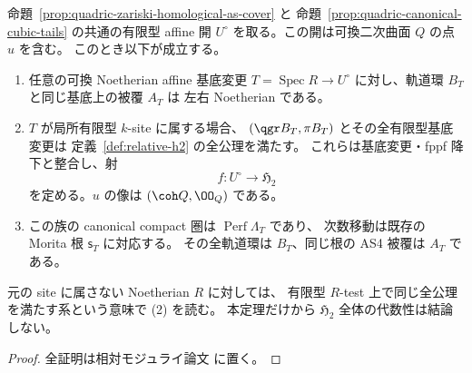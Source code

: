 \begin{theorem}[可換二次曲面の有限型相対実現]
\label{thm:quadric-finite-type-effectivity}
命題~\ref{prop:quadric-zariski-homological-as-cover} と
命題~\ref{prop:quadric-canonical-cubic-tails} の共通の有限型 affine 開
$U^\circ$ を取る。この開は可換二次曲面 $Q$ の点 $u$ を含む。
このとき以下が成立する。
\begin{enumerate}
\item 任意の可換 Noetherian affine 基底変更
$T=\operatorname{Spec}R\to U^\circ$ に対し、軌道環 $B_T$ と同じ基底上の被覆 $A_T$ は
左右 Noetherian である。
\item $T$ が局所有限型 $k$-site に属する場合、
$(\qgr B_T,\pi B_T)$ とその全有限型基底変更は
定義~\ref{def:relative-h2} の全公理を満たす。
これらは基底変更・fppf 降下と整合し、射
\[
 f:U^\circ\longrightarrow\mathfrak H_2
\]
を定める。$u$ の像は $(\coh Q,\OO_Q)$ である。
\item この族の canonical compact 圏は $\operatorname{Perf}\Lambda_T$ であり、
次数移動は既存の Morita 根 $\mathsf s_T$ に対応する。
その全軌道環は $B_T$、同じ根の AS4 被覆は $A_T$ である。
\end{enumerate}
元の site に属さない Noetherian $R$ に対しては、
有限型 $R$-test 上で同じ全公理を満たす系という意味で (2) を読む。
本定理だけから $\mathfrak H_2$ 全体の代数性は結論しない。
\end{theorem}

\begin{proof}
全証明は相対モジュライ論文 \cite[\texttt{relative_cubic_noetherian}]{QuadricModuli2026} に置く。
\end{proof}
